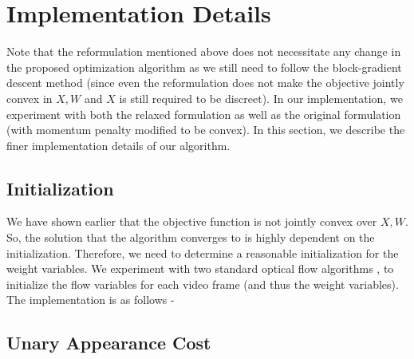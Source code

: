 \section{Implementation Details}

Note that the reformulation mentioned above does not necessitate any
change in the proposed optimization algorithm as we still need to
follow the block-gradient descent method (since even the reformulation
does not make the objective jointly convex in $X,W$ and $X$ is still
required to be discreet). In our implementation, we experiment with both the relaxed formulation as well as the original formulation (with momentum penalty modified to be convex). In this section, we describe the finer implementation details of our algorithm.


\subsection{Initialization}

We have shown earlier that the objective function is not jointly convex
over $X,W$. So, the solution that the algorithm converges to is highly
dependent on the initialization. Therefore, we need to determine a
reasonable initialization for the weight variables. We experiment
with two standard optical flow algorithms \cite{HornSchunk}, \cite{LukasKanade} to
initialize the flow variables for each video frame (and thus the weight
variables). The implementation is as follows -

\begin{algorithm}[H]
\caption{$generatePriors(I)$}
\end{algorithm}



\subsection{Unary Appearance Cost}

